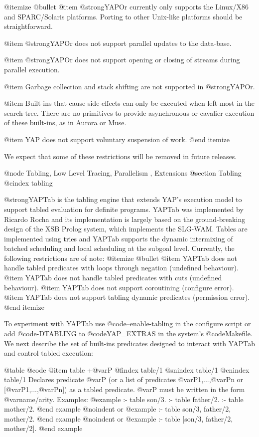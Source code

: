 @itemize @bullet
@item @strong{YAPOr} currently only supports the Linux/X86 and SPARC/Solaris
platforms. Porting to other Unix-like platforms should be straightforward.

@item @strong{YAPOr} does not support parallel updates to the
data-base.

@item @strong{YAPOr} does not support opening or closing of streams during
parallel execution.

@item Garbage collection and stack shifting are not supported in
@strong{YAPOr}.  

@item Built-ins that cause side-effects can only be executed when
left-most in the search-tree. There are no primitives to provide
asynchronous or cavalier execution of these built-ins, as in Aurora or
Muse.

@item YAP does not support voluntary suspension of work.
@end itemize

We expect that some of these restrictions will be removed in future
releases.

@node Tabling, Low Level Tracing, Parallelism , Extensions
@section Tabling
@cindex tabling

@strong{YAPTab} is the tabling engine that extends YAP's execution
model to support tabled evaluation for definite programs. YAPTab was
implemented by Ricardo Rocha and its implementation is largely based
on the ground-breaking design of the XSB Prolog system, which
implements the SLG-WAM. Tables are implemented using tries and YAPTab
supports the dynamic intermixing of batched scheduling and local
scheduling at the subgoal level. Currently, the following restrictions
are of note:
@itemize @bullet
@item YAPTab does not handle tabled predicates with loops through negation (undefined behaviour).
@item YAPTab does not handle tabled predicates with cuts (undefined behaviour).
@item YAPTab does not support coroutining (configure error).
@item YAPTab does not support tabling dynamic predicates (permission error).
@end itemize

To experiment with YAPTab use @code{--enable-tabling} in the configure
script or add @code{-DTABLING} to @code{YAP_EXTRAS} in the system's
@code{Makefile}. We next describe the set of built-ins predicates
designed to interact with YAPTab and control tabled execution:

@table @code
@item table +@var{P}
@findex table/1
@snindex table/1
@cnindex table/1
Declares predicate @var{P} (or a list of predicates
@var{P1},...,@var{Pn} or [@var{P1},...,@var{Pn}]) as a tabled
predicate. @var{P} must be written in the form
@var{name/arity}. Examples:
@example
:- table son/3.
:- table father/2.
:- table mother/2.
@end example
@noindent or
@example
:- table son/3, father/2, mother/2.
@end example
@noindent or
@example
:- table [son/3, father/2, mother/2].
@end example

